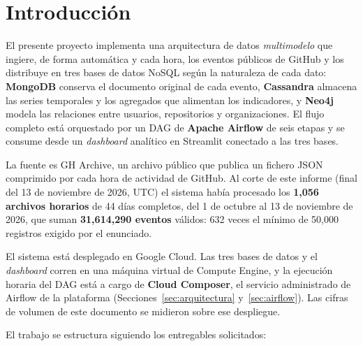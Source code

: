 \section{Introducción}

El presente proyecto implementa una arquitectura de datos \textit{multimodelo} que ingiere, de forma automática y cada hora, los eventos públicos de GitHub y los distribuye en tres bases de datos NoSQL según la naturaleza de cada dato: \textbf{MongoDB} conserva el documento original de cada evento, \textbf{Cassandra} almacena las series temporales y los agregados que alimentan los indicadores, y \textbf{Neo4j} modela las relaciones entre usuarios, repositorios y organizaciones. El flujo completo está orquestado por un DAG de \textbf{Apache Airflow} de seis etapas y se consume desde un \textit{dashboard} analítico en Streamlit conectado a las tres bases.

La fuente es GH Archive, un archivo público que publica un fichero JSON comprimido por cada hora de actividad de GitHub. Al corte de este informe (final del 13 de noviembre de 2026, UTC) el sistema había procesado los \textbf{1,056 archivos horarios} de 44 días completos, del 1 de octubre al 13 de noviembre de 2026, que suman \textbf{31,614,290 eventos} válidos: 632 veces el mínimo de 50,000 registros exigido por el enunciado.

El sistema está desplegado en Google Cloud. Las tres bases de datos y el \textit{dashboard} corren en una máquina virtual de Compute Engine, y la ejecución horaria del DAG está a cargo de \textbf{Cloud Composer}, el servicio administrado de Airflow de la plataforma (Secciones~\ref{sec:arquitectura} y~\ref{sec:airflow}). Las cifras de volumen de este documento se midieron sobre ese despliegue.

El trabajo se estructura siguiendo los entregables solicitados:

